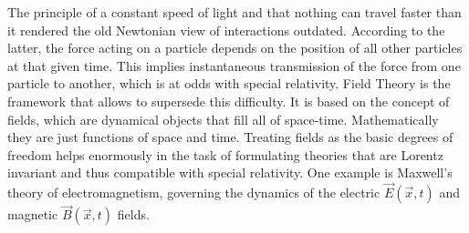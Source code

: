 The principle of a constant speed of light and that nothing can travel faster than it rendered the old Newtonian view of interactions outdated. According to the latter, the force acting on a particle depends on the position of all other particles at that given time. This implies instantaneous transmission of the force from one particle to another, which is at odds with special relativity. Field Theory is the framework that allows to supersede this difficulty. It is based on the concept of fields, which are dynamical objects that fill all of space-time. Mathematically they are just functions of space and time. Treating fields as the basic degrees of freedom helps enormously in the task of formulating theories that are Lorentz invariant and thus compatible with special relativity. One example is Maxwell's theory of electromagnetism, governing the dynamics of the electric $\vec{E}(\vec{x},t)$ and magnetic $\vec{B}(\vec{x},t)$ fields.

